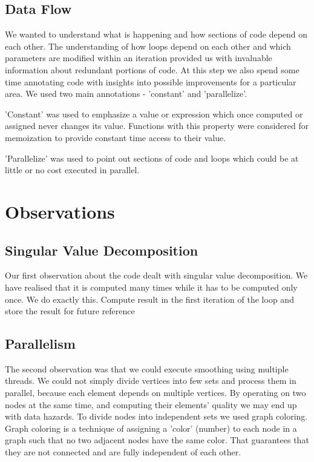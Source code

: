 \documentclass[conference]{IEEEtran}
\begin{document}
\subsection{Data Flow}
We wanted to understand what is happening and how sections of code depend on each other. 
The understanding of how loops depend on each other and which parameters are modified within an iteration provided us with invaluable information about redundant portions of code.
At this step we also spend some time annotating code with insights into possible improvements for a particular area.
We used two main annotations - 'constant' and 'parallelize'.

'Constant' was used to emphasize a value or expression which once computed or assigned never changes its value. Functions with this property were considered for memoization to provide constant time access to their value.

'Parallelize' was used to point out sections of code and loops which could be at little or no cost executed in parallel.

\section{Observations}

\subsection{Singular Value Decomposition}
Our first observation about the code dealt with singular value decomposition. We have realised that it is computed many times while it has to be computed only once. We do exactly this. Compute result in the first iteration of the loop and store the result for future reference


\subsection{Parallelism}
The second observation was that we could execute smoothing using multiple threads. 
We could not simply divide vertices into few sets and process them in parallel, because each element depends on multiple vertices.
By operating on two nodes at the same time, and computing their elements' quality we may end up with data hazards.
To divide nodes into independent sets we used graph coloring.
Graph coloring is a technique of assigning a 'color' (number) to each node in a graph such that no two adjacent nodes have the same color.
That guarantees that they are not connected and are fully independent of each other.
\end{document}
